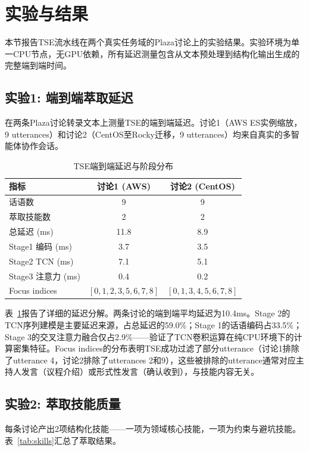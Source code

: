 \documentclass[conference]{IEEEtran}
\begin{document}
\section{实验与结果}

本节报告TSE流水线在两个真实任务域的Plaza讨论上的实验结果。实验环境为单一CPU节点，无GPU依赖，所有延迟测量包含从文本预处理到结构化输出生成的完整端到端时间。

\subsection{实验1: 端到端萃取延迟}

在两条Plaza讨论转录文本上测量TSE的端到端延迟。讨论1（AWS ES实例缩放，9 utterances）和讨论2（CentOS至Rocky迁移，9 utterances）均来自真实的多智能体协作会话。

\begin{table}[t]
\centering
\caption{TSE端到端延迟与阶段分布}
\label{tab:latency}
\setlength{\tabcolsep}{3pt}
\renewcommand{\arraystretch}{1.15}
\begin{tabular}{lcc}
\toprule
指标 & 讨论1 (AWS) & 讨论2 (CentOS) \\
\midrule
话语数 & 9 & 9 \\
萃取技能数 & 2 & 2 \\
总延迟 (ms) & 11.8 & 8.9 \\
Stage1 编码 (ms) & 3.7 & 3.5 \\
Stage2 TCN (ms) & 7.1 & 5.1 \\
Stage3 注意力 (ms) & 0.4 & 0.2 \\
Focus indices & $[0,1,2,3,5,6,7,8]$ & $[0,1,3,4,5,6,7,8]$ \\
\bottomrule
\end{tabular}
\end{table}

表~\ref{tab:latency}报告了详细的延迟分解。两条讨论的端到端平均延迟为10.4ms。Stage 2的TCN序列建模是主要延迟来源，占总延迟的59.0\%；Stage 1的话语编码占33.5\%；Stage 3的交叉注意力融合仅占2.9\%——验证了TCN卷积运算在纯CPU环境下的计算密集特征。Focus indices的分布表明TSE成功过滤了部分utterance（讨论1排除了utterance 4，讨论2排除了utterances 2和9），这些被排除的utterance通常对应主持人发言（议程介绍）或形式性发言（确认收到），与技能内容无关。

\subsection{实验2: 萃取技能质量}

每条讨论产出2项结构化技能——一项为领域核心技能，一项为约束与避坑技能。表~\ref{tab:skills}汇总了萃取结果。
\end{document}
